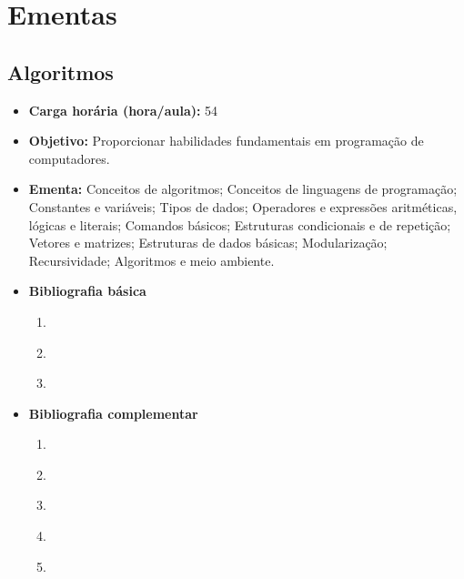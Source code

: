 \documentclass[
	10pt,				%
	openright,			%
	twoside,			%
	a4paper,			%
	english,			%
	french,				%
	brazil,				%
	sumario=tradicional
]{abntex2}
\begin{document}
\chapter{Ementas}\label{ementas}



\newpage
\section*{Algoritmos}\label{1_algoritmos}
\begin{itemize}
	\item \textbf{Carga horária (hora/aula):} 54
	\item \textbf{Objetivo:} Proporcionar habilidades fundamentais em programação de computadores.
	\item \textbf{Ementa:} 
	Conceitos de algoritmos;
	Conceitos de linguagens de programação;
	Constantes e variáveis;
	Tipos de dados;
	Operadores e expressões aritméticas, lógicas e literais; 
	Comandos básicos;
	Estruturas condicionais e de repetição;
	Vetores e matrizes;
	Estruturas de dados básicas;
	Modularização;
	Recursividade;
	Algoritmos e meio ambiente.
	\item \textbf{Bibliografia básica}

	\begin{enumerate}
		\item \cite{cormen2002algoritmos}
		\item \cite{manzano2010algoritmos}
		\item \cite{lafore2004estruturas}
	\end{enumerate}
	\item \textbf{Bibliografia complementar}
	\begin{enumerate}
		\item \cite{ascencio2010estruturas}
		\item \cite{szwarcfiter1994estruturas}
		\item \cite{silva2007estrutura}
		\item \cite{toscani2012}
		\item \cite{farrer1999algoritmos}
	\end{enumerate}	
\end{itemize}
\end{document}
